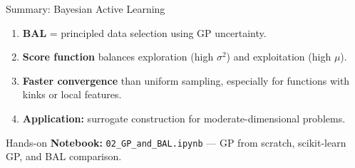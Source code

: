 \documentclass[aspectratio=169,11pt]{beamer}
\begin{document}
\begin{frame}{Summary: Bayesian Active Learning}
\begin{enumerate}
  \item \textbf{BAL} = principled data selection using GP uncertainty.
  \item \textbf{Score function} balances exploration (high $\sigma^2$) and exploitation (high $\mu$).
  \item \textbf{Faster convergence} than uniform sampling, especially for functions with kinks or local features.
  \item \textbf{Application:} surrogate construction for moderate-dimensional problems.
\end{enumerate}

\vspace{0.3cm}
\begin{block}{Hands-on}
\textbf{Notebook:} \texttt{02\_GP\_and\_BAL.ipynb} --- GP from scratch, scikit-learn GP, and BAL comparison.
\end{block}
\end{frame}

\end{document}
